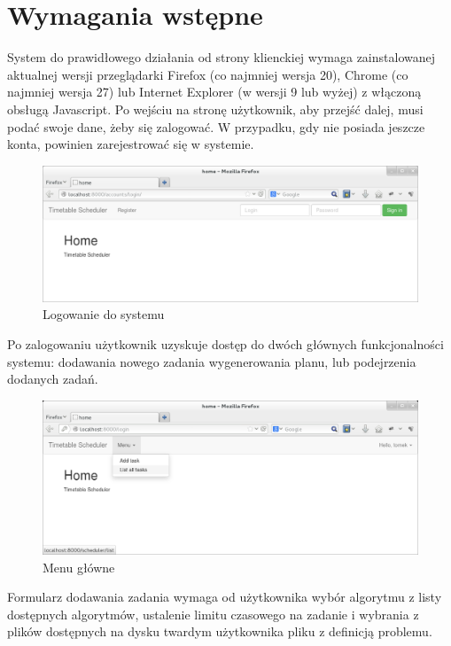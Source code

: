 \section{Wymagania wstępne}
System do prawidłowego działania od strony klienckiej wymaga zainstalowanej aktualnej wersji przeglądarki Firefox (co najmniej wersja 20), Chrome (co najmniej wersja 27) lub Internet Explorer (w wersji 9 lub wyżej) z włączoną obsługą Javascript. Po wejściu na stronę użytkownik, aby przejść dalej, musi podać swoje dane, żeby się zalogować. W przypadku, gdy nie posiada jeszcze konta, powinien zarejestrować się w systemie.
\begin{figure}[H]
\includegraphics[width=15cm]{img/guide/user1.png}
\caption{Logowanie do systemu}
\end{figure}

\par Po zalogowaniu użytkownik uzyskuje dostęp do dwóch głównych funkcjonalności systemu: dodawania nowego zadania wygenerowania planu, lub podejrzenia dodanych zadań.

\begin{figure}[H]

\includegraphics[width=15cm]{img/guide/user3.png}
\caption{Menu główne}
\end{figure}

\par Formularz dodawania zadania wymaga od użytkownika wybór algorytmu z listy dostępnych algorytmów, ustalenie limitu czasowego na zadanie i wybrania z plików dostępnych na dysku twardym użytkownika pliku z definicją problemu.

